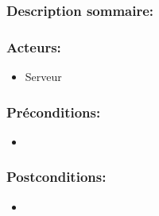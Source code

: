 \documentclass{scrreprt}
\begin{document}
\subsubsection{Description sommaire:} 
\subsubsection{Acteurs:}
\begin{itemize}
    \item Serveur
\end{itemize}
\subsubsection{Préconditions:}
\begin{itemize}
    \item  
\end{itemize} 
\subsubsection{Postconditions:}
\begin{itemize}
    \item  
\end{itemize} 
\end{document}
